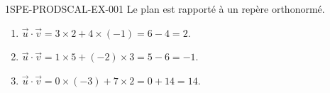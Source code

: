 \begin{corrige}{1SPE-PRODSCAL-EX-001}
Le plan est rapporté à un repère orthonormé.

\begin{enumerate}
\item $\vec{u} \cdot \vec{v} = 3 \times 2 + 4 \times (-1) = 6 - 4 = 2$.
\item $\vec{u} \cdot \vec{v} = 1 \times 5 + (-2) \times 3 = 5 - 6 = -1$.
\item $\vec{u} \cdot \vec{v} = 0 \times (-3) + 7 \times 2 = 0 + 14 = 14$.
\end{enumerate}
\end{corrige}

